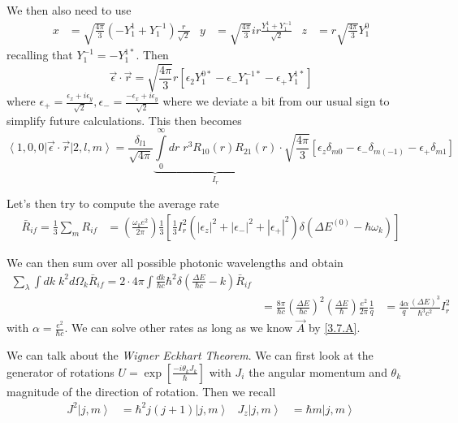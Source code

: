 \documentclass[10pt]{report}
\newcommand{\bra}[1]{\left<#1\right|}
\newcommand{\ket}[1]{\left|#1\right>}
\newcommand{\abs}[1]{\left|#1\right|}
\begin{document}
We then also need to use
\begin{align}
    x &= \sqrt{\frac{4\pi}{3}}\left( -Y_{1}^1 + Y_1^{-1} \right)\frac{r}{\sqrt{2}} & y &= \sqrt{\frac{4\pi}{3}}ir\frac{Y_1^1 + Y_1^{-1}}{\sqrt{2}} & z &= r\sqrt{\frac{4\pi}{3}}Y_1^0
\end{align}
recalling that $Y_1^{-1} = -Y_1^{1*}$. Then
\begin{equation}
    \vec{\epsilon}\cdot \vec{r} = \sqrt{\frac{4\pi}{3}}r\left[ \epsilon_2Y_1^{0*} - \epsilon_- Y_1^{-1*} - \epsilon_+Y_1^{1*} \right]
\end{equation}
where $\epsilon_+ = \frac{\epsilon_x + i\epsilon_y}{\sqrt{2}}, \epsilon_- = \frac{-\epsilon_x + i\epsilon_y}{\sqrt{2}}$ where we deviate a bit from our usual sign to simplify future calculations. This then becomes
\begin{equation}
    \bra{1,0,0}\vec{\epsilon}\cdot \vec{r}\ket{2,l,m} = \frac{\delta_{l1}}{\sqrt{4\pi}}\underbrace{\displaystyle\int\limits_{0}^{\infty}dr\;r^3R_{10}(r)R_{21}(r)}_{I_r} \cdot \sqrt{\frac{4\pi}{3}}\left[ \epsilon_z\delta_{m0} - \epsilon_{-}\delta_{m(-1)} - \epsilon_+\delta_{m1} \right]
\end{equation}

Let's then try to compute the average rate
\begin{align}
    \bar{R}_{if} = \frac{1}{3}\sum_{m}^{}R_{if} &= \left( \frac{\omega_k e^2}{2\pi} \right)\frac{1}{3}\left[ \frac{1}{3} I_r^2\left( \abs{\epsilon_z}^2 + \abs{\epsilon_-}^2 + \abs{\epsilon_+}^2 \right)\delta\left( \Delta E^{(0)} - \hbar \omega_k \right) \right]
\end{align}

We can then sum over all possible photonic wavelengths and obtain
\begin{align}
    \sum_{\lambda}^{}\int dk\; k^2d\Omega_k\bar{R}_{if} = 2\cdot 4\pi \int \frac{dk}{\hbar c} \hbar^2 \delta\left( \frac{\Delta E}{\hbar c} - k \right)\bar{R}_{if}\\
    &= \frac{8\pi}{\hbar c}\left( \frac{\Delta E}{\hbar c} \right)^2\left( \frac{\Delta E}{\hbar} \right)\frac{e^2}{2\pi}\frac{1}{q}
    &= \frac{4\alpha}{q}\frac{(\Delta E)^3}{\hbar^3 c^2}I_r^2
\end{align}
with $\alpha = \frac{e^2}{\hbar c}$. We can solve other rates as long as we know $\vec{A}$ by \eqref{3.7.A}.

We can talk about the \emph{Wigner Eckhart Theorem}. We can first look at the generator of rotations $U = \exp\left[ \frac{-i\theta_k J_k}{\hbar} \right]$ with $J_i$ the angular momentum and $\theta_k$ magnitude of the direction of rotation. Then we recall
\begin{align}
    J^2\ket{j,m} &= \hbar^2j(j+1)\ket{j,m}& J_z \ket{j,m} &= \hbar m\ket{j,m}
\end{align}
\end{document}
